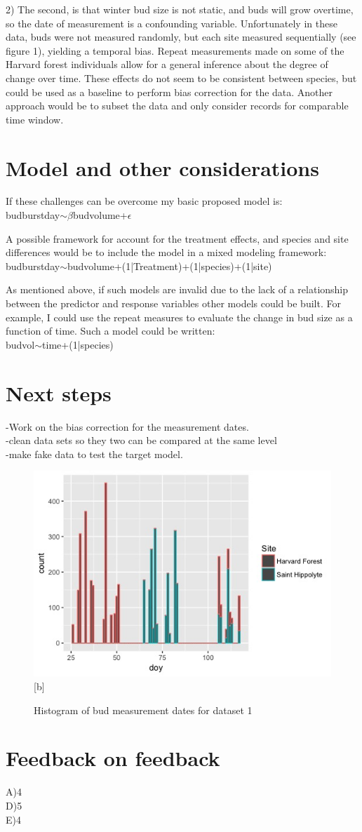 \documentclass{article}\usepackage[]{graphicx}\usepackage[]{color}
\begin{document}
2) The second, is that winter bud size is not static, and buds will grow overtime, so the date of measurement is a confounding variable. Unfortunately in these data, buds were not measured randomly, but each site measured sequentially (see figure 1), yielding a temporal  bias. Repeat measurements made on some of the Harvard forest individuals allow for a general inference about the degree of change over time. These effects do not seem to be consistent between species, but could be used as a baseline to perform bias correction for the data. Another approach would be to subset the data and only consider records for comparable time window.
\section*{Model and other considerations}
 If these challenges can be overcome my basic proposed model is:\\
budburstday$\sim\beta$budvolume+$\epsilon$\par
A possible framework for account for the treatment effects, and species and site differences would be to include the model in a mixed modeling framework:\\
budburstday$\sim$budvolume+(1|Treatment)+(1|species)+(1|site)\par
As mentioned above, if such models are invalid due to the lack of a relationship between the predictor and response variables other models could be built. For example, I could use the repeat measures to evaluate the change in bud size as a function of time. Such a model could be written:\\
budvol$\sim$time+(1|species)
\section*{Next steps}
-Work on the bias correction for the measurement dates.\\
-clean data sets so they two can be compared at the same level\\
-make fake data to test the target model.\\

\begin{figure}
\includegraphics [scale=1.5]{measurement_day_hist.jpeg}[b]
\caption{Histogram of bud measurement dates for dataset 1}
\end{figure}
\newpage[h]

\section*{Feedback on feedback}
A)4\\
D)5\\
E)4\\
\end{document}
